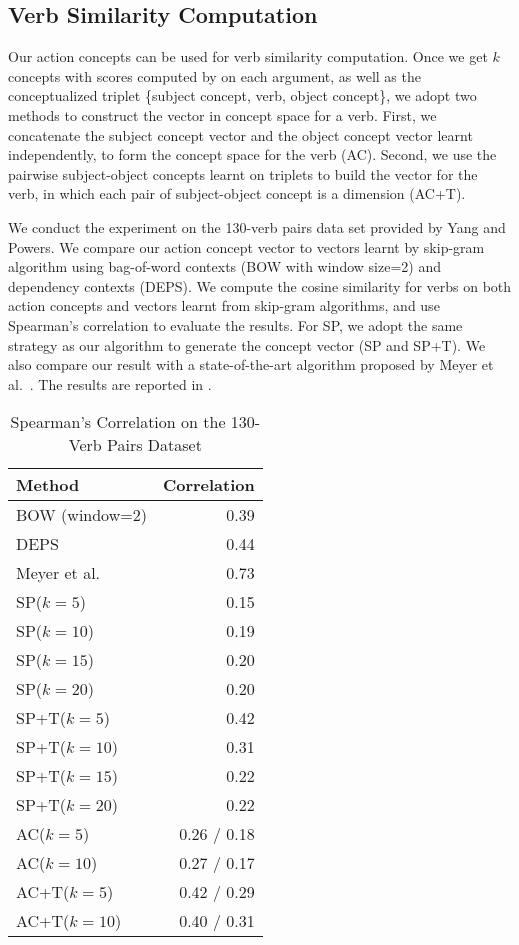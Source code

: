 \subsection{Verb Similarity Computation}
\label{sec:sim}
Our action concepts can be used for verb similarity computation. Once
we get $k$ concepts with scores computed by 
on each argument, as well as the conceptualized triplet
\{subject concept, verb, object concept\}, we adopt
two methods to construct the vector in concept space for a verb.
First, we concatenate the subject concept vector and the object
concept vector learnt independently,
to form the concept space for the verb (AC). Second,
we use the pairwise subject-object concepts learnt on
triplets to build the vector for the verb, in which each
pair of subject-object concept is a dimension (AC+T).

We conduct the experiment on the 130-verb pairs data set provided by
Yang and Powers.
We compare our action concept vector to vectors learnt by skip-gram
algorithm\cite{Levy-acl14} using bag-of-word contexts (BOW with window
size=2) and dependency contexts (DEPS). We compute the cosine similarity for
verbs on both action concepts and vectors learnt from skip-gram algorithms,
and use Spearman's correlation to evaluate the results.
For SP, we adopt the same strategy as our algorithm to generate the
concept vector (SP and SP+T). We also compare
our result with a state-of-the-art algorithm proposed by
Meyer et al.~.
The results are reported in .

\begin{table}[ht]
\small
\centering
\caption{Spearman's Correlation on the 130-Verb Pairs Dataset}
\begin{tabular}{|l|r|}
\hline
Method & Correlation \\
\hline
\hline
BOW (window=2) & 0.39 \\
\hline
DEPS & 0.44 \\
\hline
Meyer et al. & 0.73 \\
\hline
SP($k=5$) & 0.15  \\
\hline
SP($k=10$) & 0.19  \\
\hline
SP($k=15$) & 0.20  \\
\hline
SP($k=20$) & 0.20  \\
\hline
SP+T($k=5$) & 0.42 \\
\hline
SP+T($k=10$) & 0.31 \\
\hline
SP+T($k=15$) & 0.22 \\
\hline
SP+T($k=20$) & 0.22 \\
\hline
AC($k=5$) & 0.26 / {\color{red}0.18}\\
\hline
AC($k=10$) & 0.27 / {\color{red}0.17}\\
\hline
AC+T($k=5$) &  0.42 / {\color{red}0.29}\\
\hline
AC+T($k=10$) &  0.40 / {\color{red}0.31}\\
\hline
\end{tabular}
\label{tab:sim}
\end{table}

